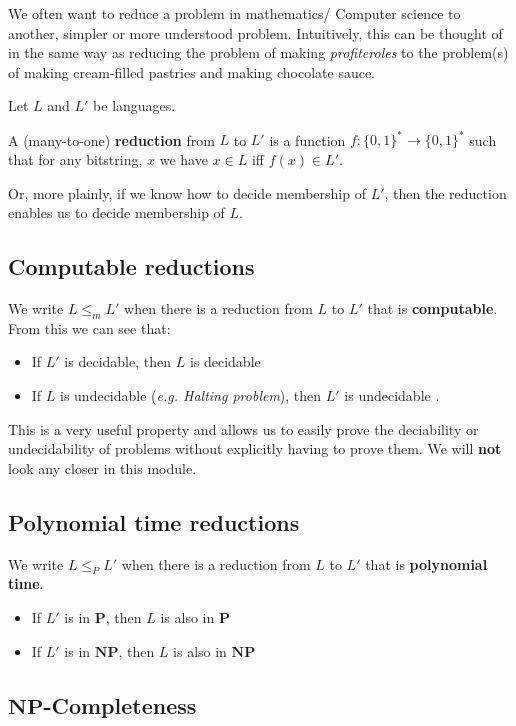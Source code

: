 \documentclass{article}
\newcommand{\NP}{\mathbf{NP}}
\renewcommand{\P}{\mathbf{P}}
\begin{document}
We often want to reduce a problem in mathematics/ Computer science to another, simpler or more understood problem. Intuitively, this can be thought of in the same way as reducing the problem of making \textit{profiteroles} to the problem(s) of making cream-filled pastries and making chocolate sauce.

Let $L$ and $L'$ be languages.

A (many-to-one) \textbf{reduction} from $L$ to $L '$ is a function $f : \{ 0,1 \} ^{*} \rightarrow \{ 0,1 \}^{*} $ such that for any bitstring, $x$ we have $x \in L$ iff $f(x) \in L '$.

Or, more plainly, if we know how to decide membership of $L '$, then the reduction enables us to decide membership of $L$.

\subsection{Computable reductions}
\label{subsec:comp-reductions}

We write $L \leq_{m} L '$ when there is a reduction from $L$ to $L '$ that is \textbf{computable}. From this we can see that:

\begin{itemize}
  \item If $L '$ is decidable, then $L$ is decidable
  \item If $L$ is undecidable (\textit{e.g. Halting problem}), then $L '$ is undecidable .
\end{itemize}

This is a very useful property and allows us to easily prove the deciability or undecidability of problems without explicitly having to prove them. We will \textbf{not} look any closer in this module.

\subsection{Polynomial time reductions}
\label{subsec:polytime-reductions}

We write $L \leq_{P } L '$ when there is a reduction from $L$ to $L ' $ that is \textbf{polynomial time}.
\begin{itemize}
  \item If $L '$ is in $\P$, then $L$ is also in $\P$
  \item If $L '$ is in $\NP$, then $L$ is also in $\NP$
\end{itemize}

\subsection{$\NP$-Completeness}
\label{subsec:np-complete}
\end{document}

